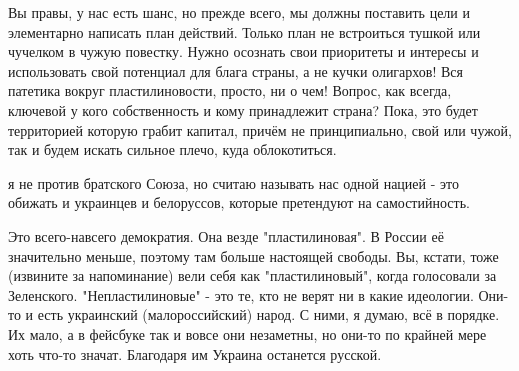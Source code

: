 \begin{cmtfront}

Вы правы, у нас есть шанс, но прежде всего, мы должны поставить цели и
элементарно написать план действий. Только план не встроиться тушкой или
чучелком в чужую повестку. Нужно осознать свои приоритеты и интересы и
использовать свой потенциал для блага страны, а не кучки олигархов! Вся
патетика вокруг пластилиновости, просто, ни о чем! Вопрос, как всегда, ключевой
у кого собственность и кому принадлежит страна? Пока, это будет территорией
которую грабит капитал, причём не принципиально, свой или чужой, так и будем
искать сильное плечо, куда облокотиться.


я не против братского Союза, но считаю называть нас одной нацией - это обижать
и украинцев и белоруссов, которые претендуют на самостийность.


Это всего-навсего демократия. Она везде "пластилиновая". В России её
значительно меньше, поэтому там больше настоящей свободы. Вы, кстати, тоже
(извините за напоминание) вели себя как "пластилиновый", когда голосовали за
Зеленского. "Непластилиновые" - это те, кто не верят ни в какие идеологии.
Они-то и есть украинский (малороссийский) народ. С ними, я думаю, всё в
порядке. Их мало, а в фейсбуке так и вовсе они незаметны, но они-то по крайней
мере хоть что-то значат. Благодаря им Украина останется русской.

\end{cmtfront}

